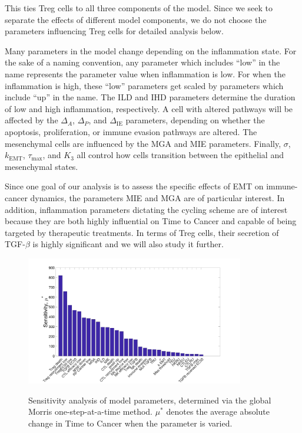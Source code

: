\documentclass[11pt]{article}
\begin{document}
This ties Treg cells to all three components of the model.
Since we seek to separate the effects of different model components, we do not choose the parameters influencing Treg cells for detailed analysis below.
\par 
Many parameters in the model change depending on the inflammation state.
For the sake of a naming convention, any parameter which includes ``low'' in the name represents the parameter value when inflammation is low.
For when the inflammation is high, these ``low'' parameters get scaled by parameters which include ``up'' in the name.
The ILD and IHD parameters determine the duration of low and high inflammation, respectively.
A cell with altered pathways will be affected by the $\Delta_A$, $\Delta_P$, and $\Delta_{\text{IE}}$ parameters, depending on whether the apoptosis, proliferation, or immune evasion pathways are altered.
The mesenchymal cells are influenced by the MGA and MIE parameters.
Finally, $\sigma$, $k_\text{EMT}$, $\tau_\text{max}$, and $K_3$ all control how cells transition between the epithelial and mesenchymal states.

Since one goal of our analysis is to assess the specific effects of EMT on immune-cancer dynamics, the parameters MIE and MGA are of particular interest.
In addition, inflammation parameters dictating the cycling scheme are of interest because they are both highly influential on Time to Cancer and capable of being targeted by therapeutic treatments.
In terms of Treg cells, their secretion of TGF-$\beta$ is highly significant and we will also study it further.


\begin{figure}
\center
{\includegraphics[width=0.85\textwidth]{Figure2/Figure2.jpg}}
\caption{Sensitivity analysis of model parameters, determined via the global Morris one-step-at-a-time method. $\mu^*$ denotes the average absolute change in Time to Cancer when the parameter is varied.}
\label{fig:MOAT}
\end{figure}
\end{document}
